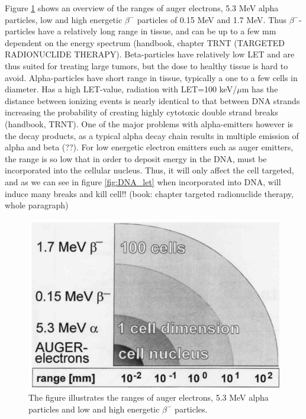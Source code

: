 Figure \ref{fig:cell_dimension} shows an overview of the ranges of auger electrons, 5.3 MeV alpha particles, low and high energetic $\beta^-$ particles of 0.15 MeV and 1.7 MeV. Thus $\beta^-$-particles have a relatively long range in tissue, and can be up to a few mm dependent on the energy spectrum (handbook, chapter TRNT (TARGETED RADIONUCLIDE THERAPY). Beta-particles have relatively low LET and are thus suited for treating large tumors, but the dose to healthy tissue is hard to avoid.  Alpha-particles have short range in tissue, typically a one to a few cells in diameter. Has a high LET-value, radiation with LET=100 keV/$\mu$m has the distance between ionizing events is nearly identical to that between DNA strands increasing the probability of creating highly cytotoxic double strand breaks (handbook, TRNT). One of the major problems with alpha-emitters however is the decay products, as a typical alpha decay chain results in multiple emission of alpha and beta (??). For low energetic electron emitters such as auger emitters, the range is so low that in order to deposit energy in the DNA, must be incorporated into the cellular nucleus. Thus, it will only affect the cell targeted, and as we can see in figure \ref{fig:DNA_let} when incorporated into DNA, will induce many breaks and kill cell!!  (book: chapter targeted radionuclide therapy, whole paragraph) \\

\begin{figure}
    \centering
    \includegraphics{Theory/cell_dimension.png}
    \caption{The figure illustrates the ranges of auger electrons, 5.3 MeV alpha particles and low and high energetic $\beta^-$ particles. }
    \label{fig:cell_dimension}
\end{figure}




